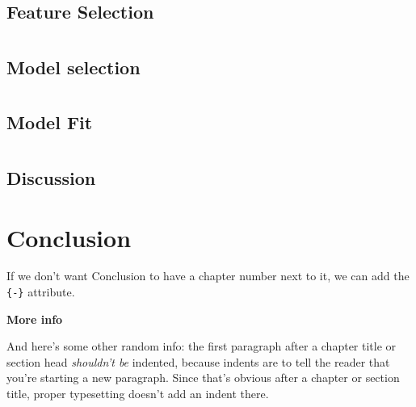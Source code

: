 \documentclass[12pt,twoside]{reedthesis}
\theoremstyle{definition}
\theoremstyle{definition}
\theoremstyle{definition}
\theoremstyle{remark}
\begin{document}
\chapter{}\label{section-2}

\section{Feature Selection}\label{feature-selection}

\chapter{}\label{section-3}

\section{Model selection}\label{model-selection}

\chapter{}\label{section-4}

\section{Model Fit}\label{model-fit}

\chapter{}\label{section-5}

\section{Discussion}\label{discussion}

\chapter*{Conclusion}\label{conclusion}

If we don't want Conclusion to have a chapter number next to it, we can
add the \texttt{\{-\}} attribute.

\textbf{More info}

And here's some other random info: the first paragraph after a chapter
title or section head \emph{shouldn't be} indented, because indents are
to tell the reader that you're starting a new paragraph. Since that's
obvious after a chapter or section title, proper typesetting doesn't add
an indent there.
\end{document}
